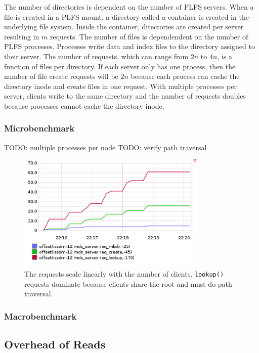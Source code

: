The number of directories is dependent on the number of PLFS servers. When a file is created in
a PLFS mount, a directory called a container is created in the underlying file
system. Inside the container, directories are created per server resulting in
\(m\) requests. The number of files is dependendent on the number of PLFS
processes. Processes write data and index files to the directory assigned to
their server. The number of requests, which can range from \(2n\) to \(4n\), is
a function of files per directory.  If each server only has one process, then
the number of file create requests will be \(2n\) because each process can
cache the directory inode and create files in one request. With multiple
processes per server, clients write to the same directory and the number of
requests doubles because processes cannot cache the directory inode.

\subsubsection{Microbenchmark}
TODO: multiple processes per node
TODO: verify path traversal
\begin{figure}[tb]
\centering
  \includegraphics[width=90mm]{figures/prob_reqs.png} 
  \caption{The requests scale linearly with the number of clients.
  \texttt{lookup()} requests dominate because clients share the root and must do
  path traversal.
  }\label{fig:arch}
\end{figure}

%
\subsubsection{Macrobenchmark}

\subsection{Overhead of Reads}

